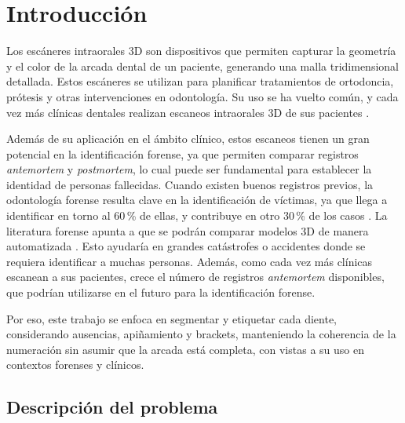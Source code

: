 %
%

\chapter{Introducción}
\label{cap:introduccion}

Los escáneres intraorales 3D son dispositivos que permiten capturar la geometría y el color de la arcada dental de un paciente, generando una malla tridimensional detallada. 
Estos escáneres se utilizan para planificar tratamientos de ortodoncia, prótesis y otras intervenciones en odontología. Su uso se ha vuelto común, y cada vez más clínicas 
dentales realizan escaneos intraorales 3D de sus pacientes \cite{leeClinicalApplicationIntraoral2024}.

Además de su aplicación en el ámbito clínico, estos escaneos tienen un gran potencial en la identificación forense, ya que permiten comparar registros \textit{antemortem} 
y \textit{postmortem}, lo cual puede ser fundamental para establecer la identidad de personas fallecidas. Cuando existen buenos registros previos, la odontología forense 
resulta clave en la identificación de víctimas, ya que llega a identificar en torno al 60\,\% de ellas, y contribuye en otro 30\,\% de los casos \cite{forrestForensicOdontologyDVI2019}.
La literatura forense apunta a que se podrán comparar modelos 3D de manera automatizada \cite{forrestForensicOdontologyDVI2019}. Esto ayudaría en grandes catástrofes o 
accidentes donde se requiera identificar a muchas personas. Además, como cada vez más clínicas escanean a sus pacientes, crece el número de registros \textit{antemortem} disponibles, 
que podrían utilizarse en el futuro para la identificación forense.

Por eso, este trabajo se enfoca en segmentar y etiquetar cada diente, considerando ausencias, apiñamiento y brackets, manteniendo la coherencia de la numeración sin asumir que la arcada
está completa, con vistas a su uso en contextos forenses y clínicos.

\section{Descripción del problema}
\label{sec:descripcion-problema}

